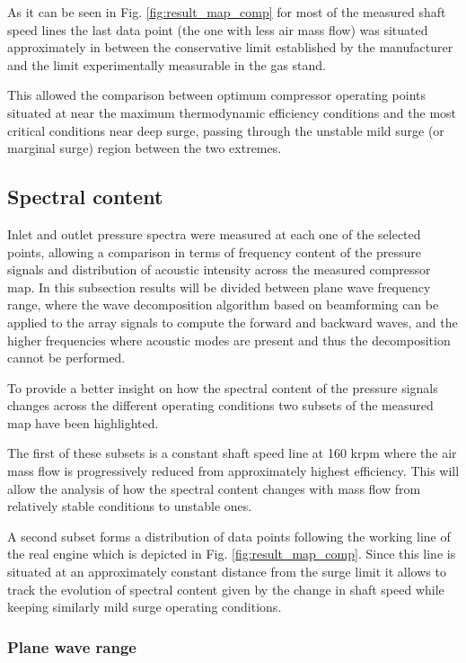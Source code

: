 As it can be seen in Fig. \ref{fig:result_map_comp} for most of the measured shaft speed lines the last data point (the one with less air mass flow) was situated approximately in between the conservative limit established by the manufacturer and the limit experimentally measurable in the gas stand. 

This allowed the comparison between optimum compressor operating points situated at near the maximum thermodynamic efficiency conditions and the most critical conditions near deep surge, passing through the unstable mild surge (or marginal surge) region between the two extremes.

\subsection{Spectral content}

Inlet and outlet pressure spectra were measured at each one of the selected points, allowing a comparison in terms of frequency content of the pressure signals and distribution of acoustic intensity across the measured compressor map. In this subsection results will be divided between plane wave frequency range, where the wave decomposition algorithm based on beamforming can be applied to the array signals to compute the forward and backward waves, and the higher frequencies where acoustic modes are present and thus the decomposition cannot be performed.

To provide a better insight on how the spectral content of the pressure signals changes across the different operating conditions two subsets of the measured map have been highlighted.

The first of these subsets is a constant shaft speed line at 160 krpm where the air mass flow is progressively reduced from approximately highest efficiency. This will allow the analysis of how the spectral content changes with mass flow from relatively stable conditions to unstable ones.

A second subset forms a distribution of data points following the working line of the real engine which is depicted in Fig. \ref{fig:result_map_comp}. Since this line is situated at an  approximately constant distance from the surge limit it allows to track the evolution of spectral content given by the change in shaft speed while keeping similarly mild surge operating conditions. 

\subsubsection{Plane wave range}

